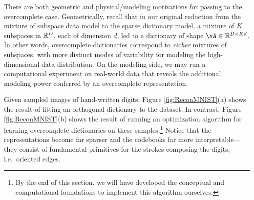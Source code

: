 \documentclass[../../book-main.tex]{subfiles}
\begin{document}
There are both geometric and physical/modeling motivations for passing to the overcomplete case. 
Geometrically, recall that in our original reduction from the mixture of subspace data model to the sparse dictionary model, a mixture of $K$ subspaces in $\mathbb{R}^D$, each of dimension $d$, led to a dictionary of shape $\vA \in \R^{D \times Kd}$.
In other words, overcomplete dictionaries correspond to \textit{richer} mixtures of subspaces, with more distinct modes of variability for modeling the high-dimensional data distribution.
On the modeling side, we may run a computational experiment on real-world data that reveals the additional modeling power conferred by an overcomplete representation.
\begin{example}
Given sampled images of hand-written digits, Figure \ref{fig:ReconMNIST}(a) shows the result of fitting an orthogonal dictionary to the dataset. 
In contrast, Figure \ref{fig:ReconMNIST}(b) shows the result of running an
    optimization algorithm for learning overcomplete dictionaries on these samples.\footnote{By the end of this section, we will have developed the conceptual and computational foundations to implement this algorithm ourselves.} 
Notice that the representations become far sparser and the codebooks far more interpretable---they consist of fundamental primitives for the strokes composing the digits, i.e.\ oriented edges.
\end{example}
\end{document}

